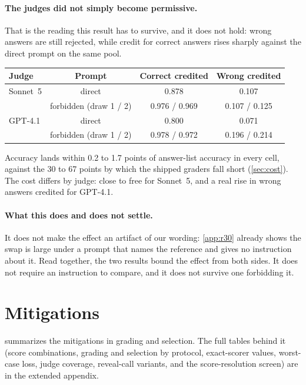 \paragraph{The judges did not simply become permissive.} That is the reading this result has to survive, and
it does not hold: wrong answers are still rejected, while credit for correct answers rises sharply against
the direct prompt on the same pool.

\begin{center}\footnotesize
\begin{tabular}{lccc}
\toprule
Judge & Prompt & Correct credited & Wrong credited \\
\midrule
Sonnet~5 & direct & 0.878 & 0.107 \\
 & forbidden (draw 1 / 2) & 0.976 / 0.969 & 0.107 / 0.125 \\
\addlinespace[2pt]
GPT-4.1 & direct & 0.800 & 0.071 \\
 & forbidden (draw 1 / 2) & 0.978 / 0.972 & 0.196 / 0.214 \\
\bottomrule
\end{tabular}
\end{center}

\noindent Accuracy lands within 0.2 to 1.7 points of answer-list accuracy in every cell, against the 30 to 67
points by which the shipped graders fall short (\cref{sec:cost}). The cost differs by judge: close to free
for Sonnet~5, and a real rise in wrong answers credited for GPT-4.1.

\paragraph{What this does and does not settle.} It does not make the effect an artifact of our wording:
\cref{app:r30} already shows the swap is large under a prompt that names the reference and gives no
instruction about it. Read together, the two results bound the effect from both sides. It does not require an
instruction to compare, and it does not survive one forbidding it.

\FloatBarrier
\section{Mitigations}
\label{app:mitigation}

 summarizes the mitigations in grading and selection. The full tables behind it (score combinations, grading and selection by protocol, exact-scorer values, worst-case loss, judge coverage, reveal-call variants, and the score-resolution screen) are in the extended appendix.

